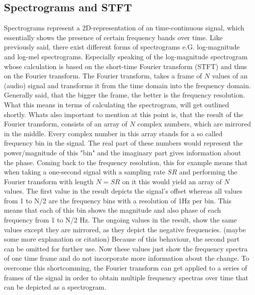 \subsection{Spectrograms and STFT}
Spectrograms represent a 2D-representation of an time-continuous signal, which essentially shows the presence of certain frequency bands over time. Like previously said, there exist different forms of spectrograms e.G. log-magnitude and log-mel spectrograms. Especially speaking of the log-magnitude spectrogram whose calculation is based on the short-time Fourier transform (STFT) and thus on the Fourier transform. The Fourier transform, takes a frame of $N$ values of an (audio) signal and transforms it from the time domain into the frequency domain. Generally said, that the bigger the frame, the better is the frequency resolution. What this means in terms of calculating the spectrogram, will get outlined shortly. Whats also important to mention at this point is, that the result of the Fourier transform, consists of an array of $N$ complex numbers, which are mirrored in the middle. Every complex number in this array stands for a so called frequency bin in the signal. The real part of these numbers would represent the power/magnitude of this "bin" and the imaginary part gives information about the phase. Coming back to the frequency resolution, this for example means that when taking a one-second signal with a sampling rate $SR$ and performing the Fourier transform with length $N=SR$ on it this would yield an array of $N$ values. The first value in the result depicts the signal's offset whereas all values from 1 to N/2 are the frequency bins with a resolution of 1Hz per bin. This means that each of this bin shows the magnitude and also phase of each frequency from 1 to N/2 Hz. The ongoing values in the result, show the same values except they are mirrored, as they depict the negative frequencies. (maybe some more explanation or citation) Because of this behaviour, the second part can be omitted for further use. Now these values just show the frequency spectra of one time frame and do not incorporate more information about the change. To overcome this shortcomming, the Fourier transform can get applied to a series of frames of the signal in order to obtain multiple frequency spectras over time that can be depicted as a spectrogram.

